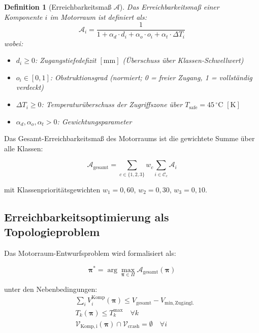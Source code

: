 ﻿\documentclass[12pt,a4paper]{article}
\newtheorem{definition}{Definition}[section]
\begin{document}
\begin{definition}[Erreichbarkeitsmaß $\mathcal{A}$]
	\label{def:erreichbarkeit}
	Das Erreichbarkeitsmaß einer Komponente $i$ im Motorraum ist definiert als:
	\begin{equation}
		\mathcal{A}_i = \frac{1}{1 + \alpha_d \cdot d_i + \alpha_o \cdot o_i
			+ \alpha_t \cdot \Delta T_i}
		\label{eq:erreichbarkeit_i}
	\end{equation}
	wobei:
	\begin{itemize}[leftmargin=*]
		\item $d_i \geq 0$: Zugangstiefedefizit $[\mathrm{mm}]$ (Überschuss über
		Klassen-Schwellwert)
		\item $o_i \in [0,1]$: Obstruktionsgrad (normiert; 0 = freier Zugang,
		1 = vollständig verdeckt)
		\item $\Delta T_i \geq 0$: Temperaturüberschuss der Zugriffszone über
		$T_\mathrm{safe} = 45\,^\circ\mathrm{C}$ $[\mathrm{K}]$
		\item $\alpha_d, \alpha_o, \alpha_t > 0$: Gewichtungsparameter
	\end{itemize}
\end{definition}

Das Gesamt-Erreichbarkeitsmaß des Motorraums ist die gewichtete Summe über
alle Klassen:

\begin{equation}
	\mathcal{A}_\mathrm{gesamt} = \sum_{c \in \{1,2,3\}} w_c
	\sum_{i \in \mathcal{C}_c} \mathcal{A}_i
	\label{eq:erreichbarkeit_gesamt}
\end{equation}

mit Klassenprioritätsgewichten $w_1 = 0{,}60$, $w_2 = 0{,}30$, $w_3 = 0{,}10$.

\subsection{Erreichbarkeitsoptimierung als Topologieproblem}

Das Motorraum-Entwurfsproblem wird formalisiert als:

\begin{equation}
	\boldsymbol{\pi}^* = \arg\max_{\boldsymbol{\pi} \in \Pi}
	\mathcal{A}_\mathrm{gesamt}(\boldsymbol{\pi})
	\label{eq:opt_problem}
\end{equation}

unter den Nebenbedingungen:
\begin{align}
	&\sum_{i} V_i^\mathrm{Komp}(\boldsymbol{\pi}) \leq V_\mathrm{gesamt} - V_\mathrm{min,Zugängl.}
	\label{eq:vol_constraint} \\
	&T_k(\boldsymbol{\pi}) \leq T_k^\mathrm{max} \quad \forall k
	\label{eq:temp_constraint} \\
	&\mathcal{V}_\mathrm{Komp,i}(\boldsymbol{\pi}) \cap \mathcal{V}_\mathrm{crash} = \emptyset
	\quad \forall i
	\label{eq:crash_constraint2}
\end{align}
\end{document}
